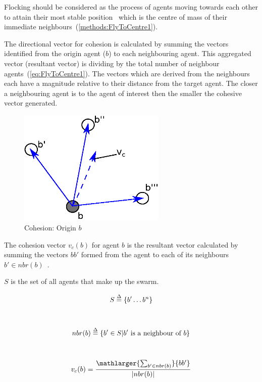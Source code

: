 Flocking should be considered as the process of agents moving towards each other to attain their most stable position~\cite{GMJ:11, IGMFM:08} which is the centre of mass of their immediate neighbours~(\autoref{methods:FlyToCentre1}). 

The directional vector for cohesion is calculated by summing the vectors identified from the origin agent ($b$) to each neighbouring agent. This aggregated vector (resultant vector) is dividing by the total number of neighbour agents~(\autoref{eq:FlyToCentre1}). The vectors which are derived from the neighbours each have a magnitude relative to their distance from the target agent. The closer a neighbouring agent is to the agent of interest then the smaller the cohesive vector generated.

\begin{figure}[H]
\begin{center}
\includegraphics[width=7cm]{CHAPTER-2/figures/FlyToCentre1}
\end{center}
\caption{Cohesion: Origin $b$ \label{methods:FlyToCentre1}}
\end{figure}

The cohesion vector $v_{c}(b)$ for agent $b$ is the resultant vector calculated by summing the vectors $bb'$ formed from the agent to each of its neighbours~$b' \in nbr(b)$~\cite{HAY:08}.

$S$ is the set of all agents that make up the swarm.

\begin{equation}\label{eq:Swarm1}
S \buildrel \Delta \over = \{b'\ldots b^{n}\}
\end{equation}‎

\begin{equation}\label{eq:Neighbours1}
nbr(b) \buildrel \Delta \over = \{b' \in S | b' \text{ is a neighbour of } b\}
\end{equation}‎

\begin{equation}\label{eq:FlyToCentre1}
v_{c}(b) = \frac{\mathlarger{\sum_{b' \in nbr(b)}}{bb'}}{|nbr(b)|}
\end{equation}‎

